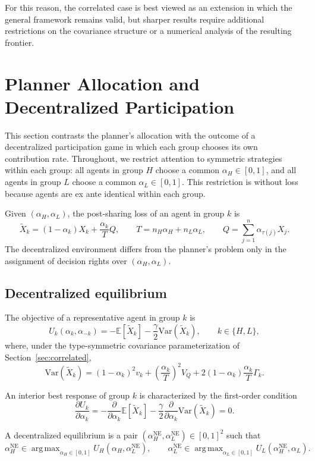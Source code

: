 \documentclass[a4paper,12pt]{article}
\theoremstyle{definition}
\theoremstyle{remark}
\newcommand{\E}{\mathbb{E}}
\newcommand{\Var}{\mathrm{Var}}
\newcommand{\1}{\mathbf{1}}
\DeclareMathOperator*{\argmax}{arg\,max}
\begin{document}
For this reason, the correlated case is best viewed as an extension in which
the general framework remains valid, but sharper results require additional
restrictions on the covariance structure or a numerical analysis of the
resulting frontier.


\section{Planner Allocation and Decentralized Participation}
\label{sec:decentralized}

This section contrasts the planner's allocation with the outcome of a
decentralized participation game in which each group chooses its own
contribution rate. Throughout, we restrict attention to symmetric strategies
within each group: all agents in group \(H\) choose a common \(\alpha_H\in[0,1]\), and
all agents in group \(L\) choose a common \(\alpha_L\in[0,1]\). This restriction
is without loss because agents are ex ante identical within each group.

Given \((\alpha_H,\alpha_L)\), the post-sharing loss of an agent in group \(k\) is
\[
\tilde X_k=(1-\alpha_k)X_k+\frac{\alpha_k}{T}Q,
\qquad
T=n_H\alpha_H+n_L\alpha_L,
\qquad
Q=\sum_{j=1}^n \alpha_{\tau(j)}X_j.
\]
The decentralized environment differs from the planner's problem only in the
assignment of decision rights over \((\alpha_H,\alpha_L)\).

\subsection{Decentralized equilibrium}

The objective of a representative agent in group \(k\) is
\[
U_k(\alpha_k,\alpha_{-k})
=
-\E[\tilde X_k]-\frac{\gamma}{2}\Var(\tilde X_k),
\qquad k\in\{H,L\},
\]
where, under the type-symmetric covariance parameterization of
Section~\ref{sec:correlated},
\[
\Var(\tilde X_k)
=
(1-\alpha_k)^2v_k
+
\left(\frac{\alpha_k}{T}\right)^{\!2}V_Q
+
2(1-\alpha_k)\frac{\alpha_k}{T}\Gamma_k.
\]

An interior best response of group \(k\) is characterized by the first-order
condition
\begin{equation}
\frac{\partial U_k}{\partial \alpha_k}
=
-\frac{\partial}{\partial \alpha_k}\E[\tilde X_k]
-\frac{\gamma}{2}\frac{\partial}{\partial \alpha_k}\Var(\tilde X_k)
=0.
\label{eq:decentralized-BR-FOC}
\end{equation}

A decentralized equilibrium is a pair
\((\alpha_H^{\mathrm{NE}},\alpha_L^{\mathrm{NE}})\in[0,1]^2\) such that
\[
\alpha_H^{\mathrm{NE}}\in\argmax_{\alpha_H\in[0,1]}
U_H(\alpha_H,\alpha_L^{\mathrm{NE}}),
\qquad
\alpha_L^{\mathrm{NE}}\in\argmax_{\alpha_L\in[0,1]}
U_L(\alpha_H^{\mathrm{NE}},\alpha_L).
\]
\end{document}
